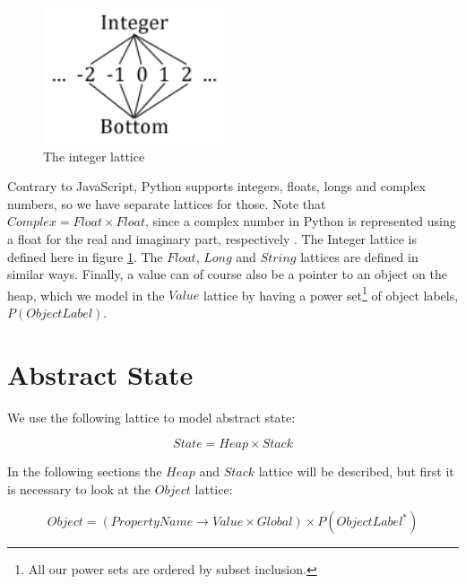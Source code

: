 \begin{figure}
	\vspace{-20pt}
	\begin{center}
		\includegraphics[width=0.48\textwidth]{images/integer-lattice.png}
	\end{center}
	\vspace{-10pt}
	\caption{The integer lattice}
	\label{fig:latticeInteger}
	\vspace{-10pt}
\end{figure}

Contrary to JavaScript, Python supports integers, floats, longs and complex numbers, so we have separate lattices for those. Note that $Complex = Float \times Float$, since a complex number in Python is represented using a float for the real and imaginary part, respectively \cite{pyref.stdtypes}. The Integer lattice is defined here in figure \ref{fig:latticeInteger}. The $Float$, $Long$ and $String$ lattices are defined in similar ways. Finally, a value can of course also be a pointer to an object on the heap, which we model in the $Value$ lattice by having a power set\footnote{All our power sets are ordered by subset inclusion.} of object labels, $P(ObjectLabel)$.


\section{Abstract State}
We use the following lattice to model abstract state:

\begin{equation*}
State = Heap \times Stack
\end{equation*}

In the following sections the $Heap$ and $Stack$ lattice will be described, but first it is necessary to look at the $Object$ lattice:

\begin{equation*}
Object = (PropertyName \rightarrow Value \times Global) \times P(ObjectLabel^{*})
\end{equation*}

